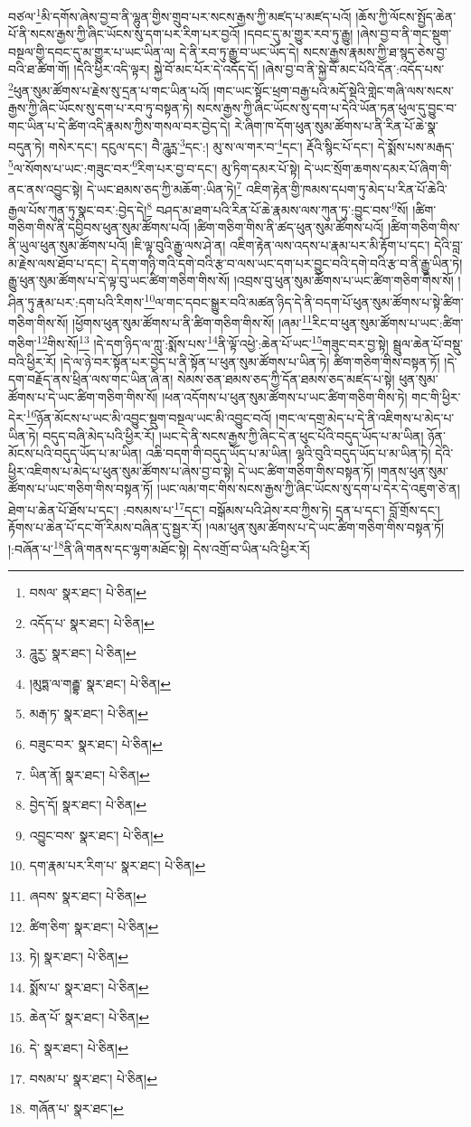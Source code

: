 བཙལ་\footnote{བསལ་  སྣར་ཐང་།  པེ་ཅིན། }མི་དགོས་ཞེས་བྱ་བ་ནི་ལྷུན་གྱིས་གྲུབ་པར་སངས་རྒྱས་ཀྱི་མཛད་པ་མཛད་པའོ། །ཆོས་ཀྱི་ལོངས་སྤྱོད་ཆེན་པོ་ནི་སངས་རྒྱས་ཀྱི་ཞིང་ཡོངས་སུ་དག་པར་རིག་པར་བྱའོ། །དབང་དུ་མ་གྱུར་རབ་ཏུ་རྒྱུ། །ཞེས་བྱ་བ་ནི་གང་སྡུག་བསྔལ་གྱི་དབང་དུ་མ་གྱུར་པ་ཡང་ཡིན་ལ། དེ་ནི་རབ་ཏུ་རྒྱུ་བ་ཡང་ཡོད་དེ། སངས་རྒྱས་རྣམས་ཀྱི་ཐ་སྙད་ཅེས་བྱ་བའི་ཐ་ཚིག་གོ། །དེའི་ཕྱིར་འདི་ལྟར། སྐྱེ་བོ་མང་པོར་དེ་འདོད་དོ། །ཞེས་བྱ་བ་ནི་སྐྱེ་བོ་མང་པོའི་དོན་:འདོད་པས་\footnote{འདོད་པ་  སྣར་ཐང་།  པེ་ཅིན། }ཕུན་སུམ་ཚོགས་པ་རྗེས་སུ་དྲན་པ་གང་ཡིན་པའོ། །གང་ཡང་སྟོང་ཕྲག་བརྒྱ་པའི་མདོ་སྡེའི་གླེང་གཞི་ལས་སངས་རྒྱས་ཀྱི་ཞིང་ཡོངས་སུ་དག་པ་རབ་ཏུ་བསྟན་ཏེ། སངས་རྒྱས་ཀྱི་ཞིང་ཡོངས་སུ་དག་པ་དེའི་ཡོན་ཏན་ཕུལ་དུ་བྱུང་བ་གང་ཡིན་པ་དེ་ཚིག་འདི་རྣམས་ཀྱིས་གསལ་བར་བྱེད་དེ། རེ་ཞིག་ཁ་དོག་ཕུན་སུམ་ཚོགས་པ་ནི་རིན་པོ་ཆེ་སྣ་བདུན་ཏེ། གསེར་དང་། དངུལ་དང་། བཻ་ཌཱུཪྻ་\footnote{ཌཱུརྱ་  སྣར་ཐང་།  པེ་ཅིན། }དང་:། མུ་ས་ལ་གར་བ་\footnote{།མུཏྶ་ལ་གརྦྷ་  སྣར་ཐང་།  པེ་ཅིན། }དང་། རྡོའི་སྙིང་པོ་དང་། དེ་སྨོས་པས་མརྒད་\footnote{མརྒ་ཏ་  སྣར་ཐང་།  པེ་ཅིན། }ལ་སོགས་པ་ཡང་:གཟུང་བར་\footnote{བཟུང་བར་  སྣར་ཐང་།  པེ་ཅིན། }རིག་པར་བྱ་བ་དང་། མུ་ཏིག་དམར་པོ་སྟེ། དེ་ཡང་སྲོག་ཆགས་དམར་པོ་ཞིག་གི་ནང་ནས་འབྱུང་སྟེ། དེ་ཡང་ཐམས་ཅད་ཀྱི་མཆོག་:ཡིན་ཏེ།\footnote{ཡིན་ནོ།  སྣར་ཐང་།  པེ་ཅིན། } འཇིག་རྟེན་གྱི་ཁམས་དཔག་ཏུ་མེད་པ་རིན་པོ་ཆེའི་རྒྱལ་པོས་ཀུན་ཏུ་སྣང་བར་:བྱེད་དེ།\footnote{བྱེད་དོ།  སྣར་ཐང་།  པེ་ཅིན། } བཤད་མ་ཐག་པའི་རིན་པོ་ཆེ་རྣམས་ལས་ཀུན་ཏུ་:བྱུང་བས་\footnote{འབྱུང་བས་  སྣར་ཐང་།  པེ་ཅིན། }སོ། །ཚིག་གཅིག་གིས་ནི་དབྱིབས་ཕུན་སུམ་ཚོགས་པའོ། །ཚིག་གཅིག་གིས་ནི་ཚད་ཕུན་སུམ་ཚོགས་པའོ། །ཚིག་གཅིག་གིས་ནི་ཡུལ་ཕུན་སུམ་ཚོགས་པའོ། །ཇི་ལྟ་བུའི་རྒྱུ་ལས་ཤེ་ན། འཇིག་རྟེན་ལས་འདས་པ་རྣམ་པར་མི་རྟོག་པ་དང་། དེའི་བླ་མ་རྗེས་ལས་ཐོབ་པ་དང་། དེ་དག་གཉི་གའི་དགེ་བའི་རྩ་བ་ལས་ཡང་དག་པར་བྱུང་བའི་དགེ་བའི་རྩ་བ་ནི་རྒྱུ་ཡིན་ཏེ། རྒྱུ་ཕུན་སུམ་ཚོགས་པ་དེ་ལྟ་བུ་ཡང་ཚིག་གཅིག་གིས་སོ། །འབྲས་བུ་ཕུན་སུམ་ཚོགས་པ་ཡང་ཚིག་གཅིག་གིས་སོ། །ཤིན་ཏུ་རྣམ་པར་:དག་པའི་རིགས་\footnote{དག་རྣམ་པར་རིག་པ་  སྣར་ཐང་།  པེ་ཅིན། }ལ་གང་དབང་སྒྱུར་བའི་མཚན་ཉིད་དེ་ནི་བདག་པོ་ཕུན་སུམ་ཚོགས་པ་སྟེ་ཚིག་གཅིག་གིས་སོ། །ཕྱོགས་ཕུན་སུམ་ཚོགས་པ་ནི་ཚིག་གཅིག་གིས་སོ། །ཞམ་\footnote{ཞབས་  སྣར་ཐང་།  པེ་ཅིན། }རིང་བ་ཕུན་སུམ་ཚོགས་པ་ཡང་:ཚིག་གཅིག་\footnote{ཚིག་ཅིག་  སྣར་ཐང་།  པེ་ཅིན། }གིས་སོ།\footnote{ཏེ།  སྣར་ཐང་།  པེ་ཅིན། } །དེ་དག་ཉིད་ལ་ཀླུ་:སྨོས་པས་\footnote{སྨོས་པ་  སྣར་ཐང་།  པེ་ཅིན། }ནི་ལྟོ་འཕྱེ་:ཆེན་པོ་ཡང་\footnote{ཆེན་པོ་  སྣར་ཐང་།  པེ་ཅིན། }གཟུང་བར་བྱ་སྟེ། སྦྲུལ་ཆེན་པོ་བསྡུ་བའི་ཕྱིར་རོ། །དེ་ལ་ཉེ་བར་སྟོན་པར་བྱེད་པ་ནི་སྟོན་པ་ཕུན་སུམ་ཚོགས་པ་ཡིན་ཏེ། ཚིག་གཅིག་གིས་བསྟན་ཏོ། །དེ་དག་བརྗོད་ནས་ཕྲིན་ལས་གང་ཡིན་ཞེ་ན། སེམས་ཅན་ཐམས་ཅད་ཀྱི་དོན་ཐམས་ཅད་མཛད་པ་སྟེ། ཕུན་སུམ་ཚོགས་པ་དེ་ཡང་ཚིག་གཅིག་གིས་སོ། །ཕན་འདོགས་པ་ཕུན་སུམ་ཚོགས་པ་ཡང་ཚིག་གཅིག་གིས་ཏེ། གང་གི་ཕྱིར་དེར་\footnote{དེ་  སྣར་ཐང་།  པེ་ཅིན། }ཉོན་མོངས་པ་ཡང་མི་འབྱུང་སྡུག་བསྔལ་ཡང་མི་འབྱུང་བའོ། །གང་ལ་དགྲ་མེད་པ་དེ་ནི་འཇིགས་པ་མེད་པ་ཡིན་ཏེ། བདུད་བཞི་མེད་པའི་ཕྱིར་རོ། །ཡང་དེ་ནི་སངས་རྒྱས་ཀྱི་ཞིང་དེ་ན་ཕུང་པོའི་བདུད་ཡོད་པ་མ་ཡིན། ཉོན་མོངས་པའི་བདུད་ཡོད་པ་མ་ཡིན། འཆི་བདག་གི་བདུད་ཡོད་པ་མ་ཡིན། ལྷའི་བུའི་བདུད་ཡོད་པ་མ་ཡིན་ཏེ། དེའི་ཕྱིར་འཇིགས་པ་མེད་པ་ཕུན་སུམ་ཚོགས་པ་ཞེས་བྱ་བ་སྟེ། དེ་ཡང་ཚིག་གཅིག་གིས་བསྟན་ཏོ། །གནས་ཕུན་སུམ་ཚོགས་པ་ཡང་གཅིག་གིས་བསྟན་ཏོ། །ཡང་ལམ་གང་གིས་སངས་རྒྱས་ཀྱི་ཞིང་ཡོངས་སུ་དག་པ་དེར་དེ་འཇུག་ཅེ་ན། ཐེག་པ་ཆེན་པོ་ཐོས་པ་དང་། :བསམས་པ་\footnote{བསམ་པ་  སྣར་ཐང་།  པེ་ཅིན། }དང་། བསྒོམས་པའི་ཤེས་རབ་ཀྱིས་ཏེ། དྲན་པ་དང་། བློ་གྲོས་དང་། རྟོགས་པ་ཆེན་པོ་དང་གོ་རིམས་བཞིན་དུ་སྦྱར་རོ། །ལམ་ཕུན་སུམ་ཚོགས་པ་དེ་ཡང་ཚིག་གཅིག་གིས་བསྟན་ཏོ། །:བཞོན་པ་\footnote{གཞོན་པ་  སྣར་ཐང་། }ནི་ཞི་གནས་དང་ལྷག་མཐོང་སྟེ། དེས་འགྲོ་བ་ཡིན་པའི་ཕྱིར་རོ། 